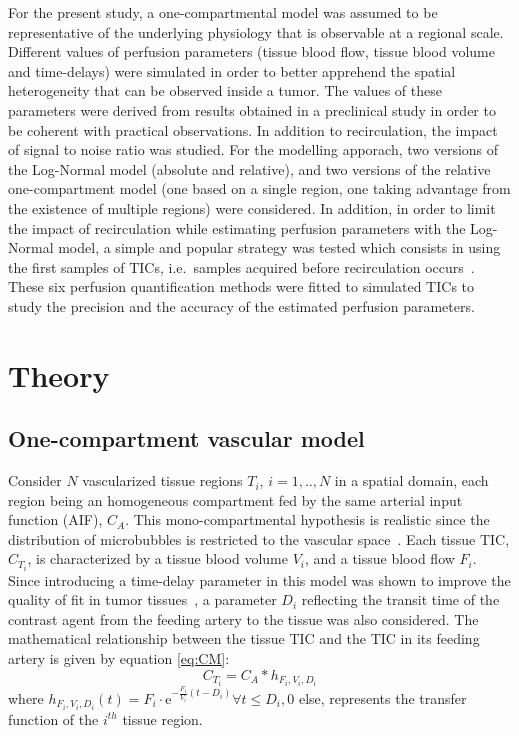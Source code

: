 For the present study, a one-compartmental model was assumed to be representative of the underlying physiology that is observable at a regional scale. Different values of perfusion parameters (tissue blood flow, tissue blood volume and time-delays) were simulated in order to better apprehend the spatial heterogeneity that can be observed inside a tumor. The values of these parameters were derived from results obtained in a preclinical study in order to be coherent with practical observations. In addition to recirculation, the impact of signal to noise ratio was  studied. For the modelling apporach, two versions of the Log-Normal model (absolute and relative), and two versions of the relative one-compartment model (one based on a single region, one taking advantage from the existence of multiple regions) were considered. In addition, in order to limit the impact of recirculation while estimating perfusion parameters with the Log-Normal model, a simple and popular strategy was tested which consists in using the first samples of TICs, i.e.~samples acquired before recirculation occurs~\cite{Lowerison2017}. These six perfusion quantification methods were fitted to simulated TICs to study the precision and  the accuracy of the estimated perfusion parameters. 

\section{Theory}

\subsection{One-compartment vascular model}
\label{sec:simmdl}
Consider $N$ vascularized tissue regions $T_i$, $i=1,..,N$ in a spatial domain, each region being an homogeneous compartment fed by the same arterial input function (AIF), $C_A$. This mono-compartmental hypothesis is realistic since the distribution of microbubbles is restricted to the vascular space~\cite{Gunn2001cx}. Each tissue TIC, $C_{T_i}$, is characterized by a tissue blood volume $V_i$, and a tissue blood flow $F_i$. Since introducing a time-delay parameter in this model was shown to improve the quality of fit in tumor tissues~\cite{Doury2017wn}, a parameter $D_i$ reflecting the transit time of the contrast agent from the feeding artery to the tissue was also considered. 
The mathematical relationship between the tissue TIC and the TIC in its feeding artery is given by equation \ref{eq:CM}:
\begin{equation}
 C_{T_i} = C_A \ast h_{F_i,V_i,D_i}
\label{eq:CM}
\end{equation}
where $h_{F_i,V_i,D_i} (t) = F_i \cdot \mathrm{e}^{-\frac{F_i}{V_i} \left( t - D_i \right)}\forall t \leq D_i, 0$ else, represents the transfer function of the $i^{th}$ tissue region.

